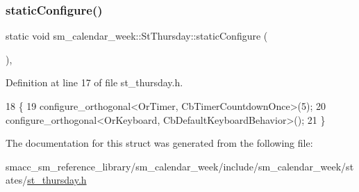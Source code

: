 \subsubsection{\texorpdfstring{static\+Configure()}{staticConfigure()}}
{\footnotesize\ttfamily static void sm\+\_\+calendar\+\_\+week\+::\+St\+Thursday\+::static\+Configure (\begin{DoxyParamCaption}{ }\end{DoxyParamCaption})\hspace{0.3cm}{\ttfamily [inline]}, {\ttfamily [static]}}



Definition at line 17 of file st\+\_\+thursday.\+h.


\begin{DoxyCode}
18     \{
19         configure\_orthogonal<OrTimer,  CbTimerCountdownOnce>(5);    
20         configure\_orthogonal<OrKeyboard, CbDefaultKeyboardBehavior>();
21     \}
\end{DoxyCode}


The documentation for this struct was generated from the following file\+:\begin{DoxyCompactItemize}
\item 
smacc\+\_\+sm\+\_\+reference\+\_\+library/sm\+\_\+calendar\+\_\+week/include/sm\+\_\+calendar\+\_\+week/states/\hyperlink{st__thursday_8h}{st\+\_\+thursday.\+h}\end{DoxyCompactItemize}
